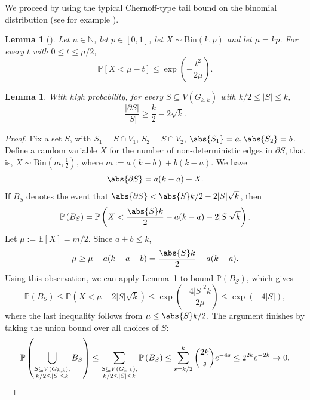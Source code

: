 \documentclass[a4paper,11pt]{article}
\newtheorem{lemma}[theorem]{Lemma}
\theoremstyle{definition}
\newcommand{\Prob}[1]{\mathbb{P}\left(#1\right)}
\newcommand{\Exp}[1]{\mathbb{E}\left[#1\right]}
\begin{document}
We proceed by using the typical Chernoff-type tail bound on the binomial distribution (see for example \cite[Appendix A]{AS2016}).

\begin{lemma}[{\cite{AS2016}}]\label{lem:Chernoff}
Let $n \in \mathbb{N}$, let $p \in [0,1]$, let $X \sim \text{Bin}(k,p)$ and let $\mu = kp$. For every $t$ with $0\le t \leq \mu/2$, 
\[
\mathbb{P}\left[X < \mu - t\right] \leq \exp\left(-\frac{t^2}{2\mu} \right).
\]
\end{lemma}

\begin{lemma}\label{lem:split_large_s}
    With high probability, for every $S\subseteq V(G_{k,k})$ with $k/2 \leq |S| \leq k$,
    \begin{equation*}
        \frac{|\partial S|}{|S|} \geq \frac{k}{2} - 2\sqrt{k}.
    \end{equation*}
\end{lemma}
\begin{proof}
    Fix a set $S$, with $S_1 = S \cap V_1$, $S_2 = S \cap V_2$, $\abs{S_1} = a, \abs{S_2} = b$. Define a random variable $X$ for the number of non-deterministic edges in $\partial S$, that is, $X\sim \text{Bin}(m,\frac{1}{2})$, where $m:= a(k-b)+b(k-a)$. We have
    \begin{equation*}
        \abs{\partial S} = a(k-a) + X.
    \end{equation*}
    If $B_S$ denotes the event that $\abs{\partial S} < \abs{S}k/2 - 2|S|\sqrt{k}$, then
    \begin{equation*}
        \Prob{B_S} = \Prob{X < \frac{\abs{S}k}{2} -a(k-a)- 2|S|\sqrt{k}}.
    \end{equation*}
    Let $\mu:=\Exp{X} = m/2$. Since $a+b \leq k$,
    \begin{equation*}
        \mu \geq \mu - a(k-a-b) = \frac{\abs{S}k}{2} -a(k-a).
    \end{equation*}
    Using this observation, we can apply Lemma~\ref{lem:Chernoff} to bound $\Prob{B_S}$, which gives
    \begin{equation*}
        \Prob{B_S} \leq \Prob{X < \mu - 2|S|\sqrt{k}}
        \leq \exp\left(-\frac{4|S|^2k}{2\mu}\right)
        \leq \exp\left(-4|S|\right),
    \end{equation*}    
    where the last inequality follows from $\mu \leq \abs{S}k/2$. The argument finishes by taking the union bound over all choices of $S$: 
    \begin{equation*}
        \Prob{\bigcup_{\substack{S \subseteq V(G_{k,k}),\\ k/2 \leq |S| \leq k}}B_S} \leq \sum_{\substack{S \subseteq V(G_{k,k}),\\ k/2 \leq |S| \leq k}}\Prob{B_S} \leq \sum_{s=k/2}^{k} \binom{2k}{s} e^{-4s} \leq 2^{2k}e^{-2k} \to 0.\qedhere
    \end{equation*}
\end{proof}
\end{document}
